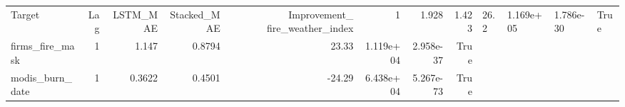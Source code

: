 \begin{tabular}{lrrrrrrr}
\toprule
Target & Lag & LSTM_MAE & Stacked_MAE & Improvement_%
\midrule
fire_weather_index & 1 & 1.928 & 1.423 & 26.2 & 1.169e+05 & 1.786e-30 & True \\
firms_fire_mask & 1 & 1.147 & 0.8794 & 23.33 & 1.119e+04 & 2.958e-37 & True \\
modis_burn_date & 1 & 0.3622 & 0.4501 & -24.29 & 6.438e+04 & 5.267e-73 & True \\
\bottomrule
\end{tabular}
